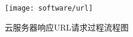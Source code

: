 \begin{figure}[h]
    \centering
    \texttt{[image: software/url]}
    \caption{\label{fig:url}云服务器响应URL请求过程流程图}
\end{figure}




